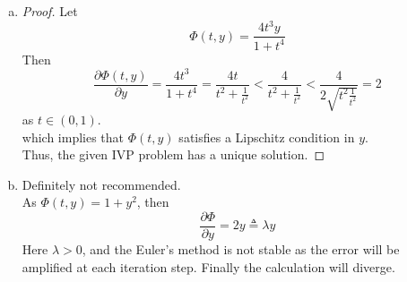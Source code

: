\documentclass[paper=a4, fontsize=11pt]{scrartcl} %
\numberwithin{equation}{section} %
\numberwithin{figure}{section} %
\numberwithin{table}{section} %
\begin{document}
\begin{enumerate}[(a)]
		\item
			\begin{proof}
				Let
				\begin{equation}
					\Phi(t, y) = \frac{4t^3y}{1+t^4}
				\end{equation}
				Then
				\begin{equation}
					\frac{\partial \Phi(t, y)}{\partial y} = \frac{4t^3}{1+t^4} =\frac{4 t}{t^2 + \frac{1}{t^2}} < \frac{4}{t^2 + \frac{1}{t^2}} < \frac{4}{2 \sqrt{t^2 \frac{1}{t^2}}} = 2
				\end{equation}
				as $t\in (0,1)$.\\ 
				which implies that $\Phi(t, y)$ satisfies a Lipschitz condition in $y$.\\
				Thus, the given IVP problem has a unique solution.
			\end{proof} 
		
		\item 
			Definitely not recommended.\\
			As $\Phi(t, y) = 1 + y^2$, then
			\begin{equation}
				\frac{\partial \Phi}{\partial y} = 2 y \triangleq \lambda y
			\end{equation}
			Here $\lambda > 0$, and the Euler's method is not stable as the error will be amplified at each iteration step. Finally the calculation will diverge.
	\end{enumerate}
\end{document}
